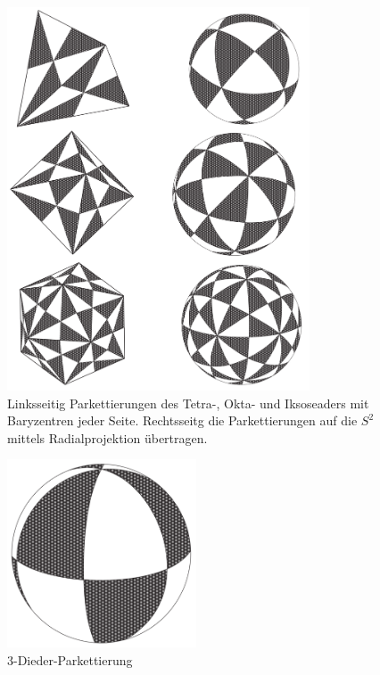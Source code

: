 \documentclass[12pt,a4paper]{article}
\theoremstyle{plain}
\numberwithin{equation}{section}
\begin{document}
\begin{figure}[h]
\includegraphics[width=0.8\textwidth]{polyeder.png}
\caption{Linksseitig Parkettierungen des Tetra-, Okta- und Iksoseaders mit Baryzentren jeder Seite. Rechtsseitg die Parkettierungen auf die $S^2$ mittels Radialprojektion übertragen.}
\end{figure}

\begin{figure} \includegraphics[width=0.5\textwidth]{Dieder.png}
\caption{$3$-Dieder-Parkettierung}
\end{figure}
\end{document}
